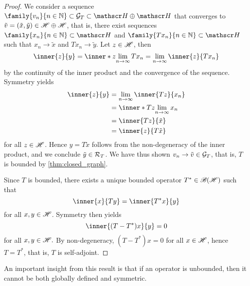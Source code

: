 \begin{proof}
    We consider a sequence \(\family{v_n}{n \in \mathbb{N}} \subset \graph{T} \subset \hilbert \oplus \hilbert\) that converges to \(\tilde{v} = (\tilde{x}, \tilde{y}) \in \mathscr{H}\oplus\mathscr{H}\), that is, there exist sequences \(\family{x_n}{n \in \mathbb{N}} \subset \hilbert\) and \(\family{Tx_n}{n \in \mathbb{N}} \subset \hilbert\) such that \(x_n \to \tilde{x}\) and \(Tx_n \to \tilde{y}\). Let \(z \in \mathscr{H}\), then
    \begin{equation*}
        \inner{z}{y} = \inner*{z}{\lim_{n \to \infty}{Tx_n}} = \lim_{n\to \infty}{\inner{z}{Tx_n}}
    \end{equation*}
    by the continuity of the inner product and the convergence of the sequence. Symmetry yields
    \begin{align*}
        \inner{z}{y} &= \lim_{n\to\infty}{\inner{Tz}{x_n}} \\&= \inner*{Tz}{\lim_{n\to\infty}{x_n}} \\&= \inner{Tz}{\tilde{x}}\\
                     &= \inner{z}{T\tilde{x}}
    \end{align*}
    for all \(z \in \mathscr{H}\). Hence \(y = T\tilde{x}\) follows from the non-degeneracy of the inner product, and we conclude \(\tilde{y} \in \mathcal{R}_{T}\). We have thus shown \(v_n \to \tilde{v} \in \mathcal{G}_{T}\), that is, \(T\) is bounded by \cref{thm:closed_graph}.

    Since \(T\) is bounded, there exists a unique bounded operator \(T^* \in \mathscr{B}(\mathscr{H})\) such that
    \begin{equation*}
        \inner{x}{Ty} = \inner{T^*x}{y}
    \end{equation*}
    for all \(x, y \in \mathscr{H}\). Symmetry then yields
    \begin{equation*}
        \inner{(T - T^*)x}{y} = 0
    \end{equation*}
    for all \(x, y \in \mathscr{H}.\) By non-degeneracy, \((T - T^*)x = 0\) for all \(x \in \mathscr{H}\), hence \(T = T^*\), that is, \(T\) is self-adjoint.
\end{proof}
An important insight from this result is that if an operator is unbounded, then it cannot be both globally defined and symmetric.

